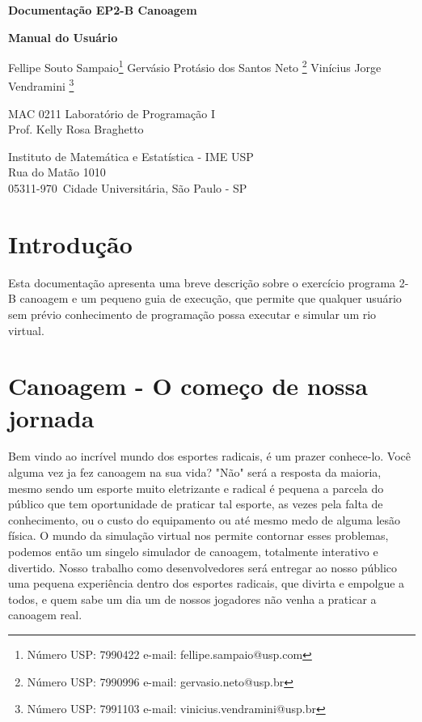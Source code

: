 \documentclass[a4paper,11pt]{article}
\begin{document}
\begin{center}{\Large \bf Documenta\c{c}ão EP2-B Canoagem \\ }\end{center}
\begin{center}{\Large \bf Manual do Usuário\\ }\end{center}

\begin{center}
{
Fellipe Souto Sampaio\footnote{Número USP: 7990422 e-mail: fellipe.sampaio@usp.com}
Gervásio Protásio dos Santos Neto \footnote{Número USP: 7990996 e-mail: gervasio.neto@usp.br}
Vinícius Jorge Vendramini \footnote{Número USP: 7991103 e-mail: vinicius.vendramini@usp.br}
}

\end{center}

\begin{center}
MAC 0211 Laboratório de Programa\c{c}ão I \\
Prof. Kelly Rosa Braghetto \\
             
\end{center}

\begin{center}
Instituto de Matemática e Estatística - IME USP \\
 Rua do Matão 1010 \\
 05311-970\, Cidade Universitária, São Paulo - SP \\
\end{center}

\newpage

\section{Introdu\c{c}ão}
Esta documenta\c{c}ão apresenta uma breve descri\c{c}ão sobre o exercício programa 2-B canoagem e um pequeno guia de execu\c{c}ão, que permite que qualquer usuário sem prévio conhecimento de programa\c{c}ão possa executar e simular um rio virtual.

\section{Canoagem - O come\c{c}o de nossa jornada}
Bem vindo ao incrível mundo dos esportes radicais, é um prazer conhece-lo. Você alguma vez ja fez canoagem na sua vida? "Não" será a resposta da maioria, mesmo sendo um esporte muito eletrizante e radical é pequena a parcela do público que tem oportunidade de praticar tal esporte, as vezes pela falta de conhecimento, ou o custo do equipamento ou até mesmo medo de alguma lesão física.
O mundo da simula\c{c}ão virtual nos permite contornar esses problemas, podemos então um singelo simulador de canoagem, totalmente interativo e divertido. Nosso trabalho como desenvolvedores será entregar ao nosso público uma pequena experiência dentro dos esportes radicais, que divirta e empolgue a todos, e quem sabe um dia um de nossos jogadores não venha a praticar a canoagem real.
\end{document}
